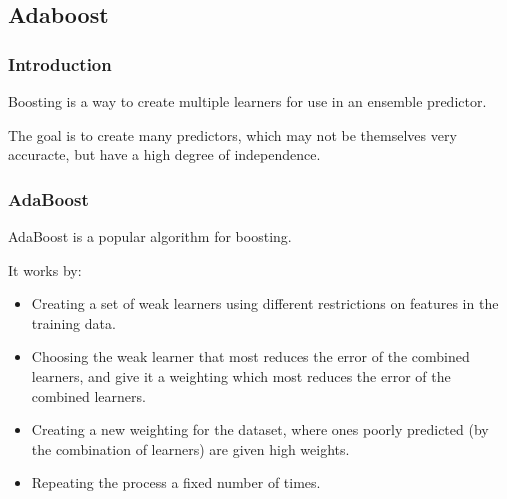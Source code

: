 
\subsection{Adaboost}

\subsubsection{Introduction}

Boosting is a way to create multiple learners for use in an ensemble predictor.

The goal is to create many predictors, which may not be themselves very accuracte, but have a high degree of independence.

\subsubsection{AdaBoost}

AdaBoost is a popular algorithm for boosting.

It works by:

\begin{itemize}
\item Creating a set of weak learners using different restrictions on features in the training data.
\item Choosing the weak learner that most reduces the error of the combined learners, and give it a weighting which most reduces the error of the combined learners.
\item Creating a new weighting for the dataset, where ones poorly predicted (by the combination of learners) are given high weights.
\item Repeating the process a fixed number of times.
\end{itemize}



